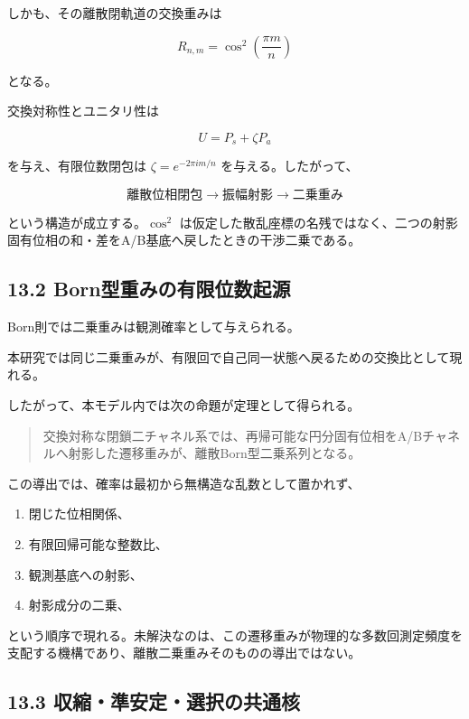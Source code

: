 \documentclass[
  a4paper,
  10pt]{article}
\providecommand{\tightlist}{%
  \setlength{\itemsep}{0pt}\setlength{\parskip}{0pt}}
\begin{document}
しかも、その離散閉軌道の交換重みは

\[
R_{n,m}=\cos^2\left(\frac{\pi m}{n}\right)
\]

となる。

交換対称性とユニタリ性は

\[
U=P_s+\zeta P_a
\]

を与え、有限位数閉包は \(\zeta=e^{-2\pi im/n}\) を与える。したがって、

\[
\text{離散位相閉包}
\longrightarrow
\text{振幅射影}
\longrightarrow
\text{二乗重み}
\]

という構造が成立する。\(\cos^2\)
は仮定した散乱座標の名残ではなく、二つの射影固有位相の和・差をA/B基底へ戻したときの干渉二乗である。

\subsection{13.2
Born型重みの有限位数起源}\label{132-bornux578bux91cdux307fux306eux6709ux9650ux4f4dux6570ux8d77ux6e90}

Born則では二乗重みは観測確率として与えられる。

本研究では同じ二乗重みが、有限回で自己同一状態へ戻るための交換比として現れる。

したがって、本モデル内では次の命題が定理として得られる。

\begin{quote}
交換対称な閉鎖二チャネル系では、再帰可能な円分固有位相をA/Bチャネルへ射影した遷移重みが、離散Born型二乗系列となる。
\end{quote}

この導出では、確率は最初から無構造な乱数として置かれず、

\begin{enumerate}
\def\labelenumi{\arabic{enumi}.}
\tightlist
\item
  閉じた位相関係、
\item
  有限回帰可能な整数比、
\item
  観測基底への射影、
\item
  射影成分の二乗、
\end{enumerate}

という順序で現れる。未解決なのは、この遷移重みが物理的な多数回測定頻度を支配する機構であり、離散二乗重みそのものの導出ではない。

\subsection{13.3
収縮・準安定・選択の共通核}\label{133-ux53ceux7e2eux6e96ux5b89ux5b9aux9078ux629eux306eux5171ux901aux6838}
\end{document}
